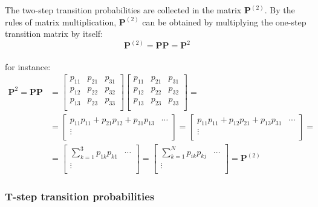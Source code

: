 \documentclass[\main/main.tex]{subfiles}
\begin{document}
\noindent The two-step transition probabilities are collected in the matrix $\mathbf{P}^{(2)}$. By the rules of matrix multiplication,  $\mathbf{P}^{(2)}$ can be obtained by multiplying the one-step transition matrix by itself:
\begin{equation}
    \mathbf{P}^{(2)} = \mathbf{P} \mathbf{P} = \mathbf{P}^2 
\end{equation}\\
for instance:
\begin{equation}
\begin{split}
  \mathbf{P}^2 = \mathbf{P} \mathbf{P} &= 
\begin{bmatrix}
p_{11} & p_{21} & p_{31} \\
p_{12} & p_{22} & p_{32}  \\
p_{13} & p_{23} & p_{33}  \\
\end{bmatrix}
\begin{bmatrix}
p_{11} & p_{21} & p_{31} \\
p_{12} & p_{22} & p_{32}  \\
p_{13} & p_{23} & p_{33}  \\
\end{bmatrix}=\\
&= 
\begin{bmatrix}
p_{11}p_{11} + p_{21}p_{12} + p_{31}p_{13} & \cdots \\
\vdots\\
\end{bmatrix} =
\begin{bmatrix}
p_{11}p_{11} + p_{12}p_{21} + p_{13}p_{31} & \cdots \\
\vdots\\
\end{bmatrix} =\\
&= 
\begin{bmatrix}
\sum_{k=1}^3 p_{1k}p_{k1} & \cdots\\
\vdots\\
\end{bmatrix} = 
\begin{bmatrix}
\sum_{k=1}^N p_{ik}p_{kj} & \cdots\\
\vdots\\
\end{bmatrix} = 
\mathbf{P}^{(2)} 
\end{split}
\end{equation}




\subsubsection{T-step transition probabilities }
\end{document}
